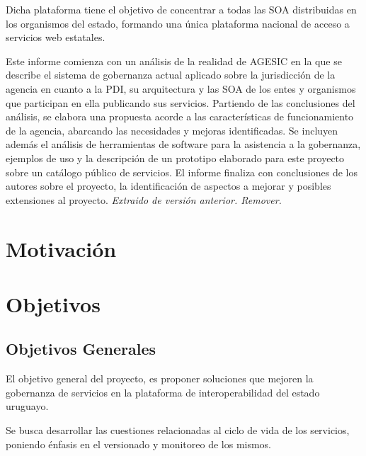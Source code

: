 Dicha plataforma tiene el objetivo de concentrar a todas las SOA distribuidas en los organismos del estado, formando una única plataforma nacional de acceso a servicios web estatales.

Este informe comienza con un análisis de la realidad de AGESIC en la que se describe el sistema de gobernanza actual aplicado sobre la jurisdicción de la agencia en cuanto a la PDI, su arquitectura y las SOA de los entes y organismos que participan en ella publicando sus servicios. Partiendo de las conclusiones del análisis, se elabora una propuesta acorde a las características de funcionamiento de la agencia, abarcando las necesidades y mejoras identificadas.
Se incluyen además el análisis de herramientas de software para la asistencia a la gobernanza, ejemplos de uso y la descripción de un prototipo elaborado para este proyecto sobre un catálogo público de servicios.
El informe finaliza con conclusiones de los autores sobre el proyecto, la identificación de aspectos a mejorar y posibles extensiones al proyecto.
\emph{Extraido de versión anterior. Remover.}



\section{Motivación}
\label{Introduccion:Motivacion}

\section{Objetivos}
\label{Introduccion:Objetivos}

\subsection{Objetivos Generales}
\label{Introduccion:Objetivos_Generales}
El objetivo general del proyecto, es proponer soluciones que mejoren la gobernanza de servicios en la plataforma de interoperabilidad del estado uruguayo.

Se busca desarrollar las cuestiones relacionadas al ciclo de vida de los servicios, poniendo énfasis en el versionado y monitoreo de los mismos.

